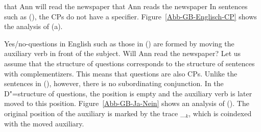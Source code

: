 \eal
\ex that Ann will read the newspaper
\ex\label{ex-that-ann-reads-the-newspaper}that Ann reads the newspaper
\zl
In sentences such as (), the CPs do not have a specifier. Figure~\vref{Abb-GB-Englisch-CP} shows the analysis
of (a). 
\begin{figure}
\begin{floatrow}
\end{floatrow}
\end{figure}%

Yes/no-questions\label{Seite-GB-Entscheidungsfragen-Englisch} in English such as those in () are formed by moving the auxiliary verb in front of the subject.
\ea
Will Ann read the newspaper?
\z
Let us assume that the structure of questions corresponds to the structure of sentences with complementizers. This means that questions are also
CPs. Unlike the sentences in (), however, there is no subordinating conjunction. In the D"=structure of questions, the \cnull position is
empty and the auxiliary verb is later moved to this position. Figure~\vref{Abb-GB-Ja-Nein} shows an analysis of ().
The original position of the auxiliary is marked by the trace \_$_k$, which is coindexed with the moved auxiliary.

